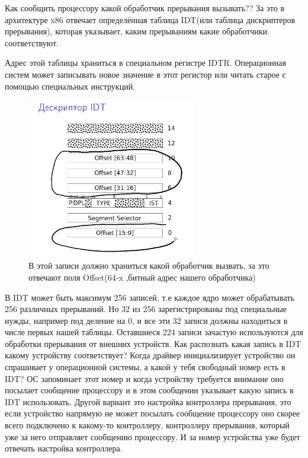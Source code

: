 	\par Как сообщить процессору какой обработчик прерывания вызывать?? За это в архитектуре x86 отвечает определённая таблица IDT(или таблица дискриптеров прерывания), которая указывает, каким прерываниям какие обработчики.
	соответствуют.
	\par Адрес этой таблицы храниться в специальном регистре IDTR. Операционная систем может записывать новое значение в этот регистор или читать старое с помощью специальных инструкций.    

    \begin{figure}[h]
    	\centering
    	\includegraphics[height=7cm]{img/3.3} 
    	\captionsetup{font=footnotesize} 
    	\caption*{В этой записи должно храниться какой обработчик вызвать, за это отвечают поля Offset(64-x ,битный адрес нашего обработчика)} 
    \end{figure}
    
    \par В IDT может быть максимум 256 записей, т.е каждое ядро может обрабатывать 256 различных прерываний. Но 32 из 256 зарегистрированы   под специальные нужды, например под деление на 0, и все эти 32 записи должны находиться в числе первых нашей таблицы. Оставшиеся 224 записи зачастую используются для обработки прерывания от внешних устройств. Как распознать какая запись в IDT какому устройству соответствует? Когда драйвер инициализирует устройство он спрашивает у операционной системы, а какой у тебя свободный номер есть в IDT? ОС запоминает этот номер и когда устройству требуется внимание оно посылает сообщение процессору и в этом сообщении указывает какую запись в IDT использовать. Другой вариант это настройка контроллера прерывания, это если устройство напрямую не может посылать сообщение процессору оно скорее всего подключено к какому-то контроллеру, контроллеру прерывания, который уже за него отправляет сообщению процессору. И за номер устройства уже будет отвечать настройка контроллера.
    
